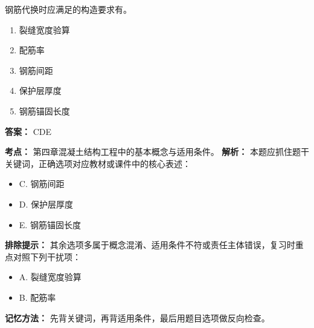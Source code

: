 \documentclass[UTF8,fontset=fandol,11pt]{ctexart}
\begin{document}
\begin{quizbox}[title={第 15 题}]
钢筋代换时应满足的构造要求有。\\
\begin{enumerate}[label=\Alph*.]
\item 裂缝宽度验算
\item 配筋率
\item 钢筋间距
\item 保护层厚度
\item 钢筋锚固长度
\end{enumerate}
\textbf{答案：} CDE
\vspace{0.25em}
\begin{answerbox}[title={考点解析}]
\textbf{考点：} 第四章混凝土结构工程中的基本概念与适用条件。
\textbf{解析：} 本题应抓住题干关键词，正确选项对应教材或课件中的核心表述：
\begin{itemize}
\item C. 钢筋间距
\item D. 保护层厚度
\item E. 钢筋锚固长度
\end{itemize}
\textbf{排除提示：} 其余选项多属于概念混淆、适用条件不符或责任主体错误，复习时重点对照下列干扰项：
\begin{itemize}
\item A. 裂缝宽度验算
\item B. 配筋率
\end{itemize}
\textbf{记忆方法：} 先背关键词，再背适用条件，最后用题目选项做反向检查。
\end{answerbox}
\end{quizbox}

\vspace{0.2em}
\end{document}
